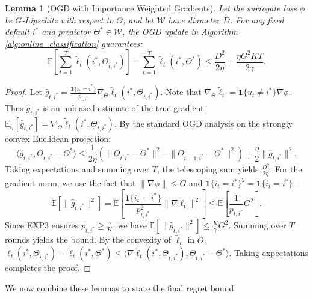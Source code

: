 \documentclass[11pt]{article}
\newtheorem{lemma}{Lemma}
\begin{document}
\begin{lemma}[OGD with Importance Weighted Gradients]
\label{lem:ogd}
Let the surrogate loss $\phi$ be $G$-Lipschitz with respect to $\Theta$, and let $\mathcal{W}$ have diameter $D$. For any fixed default $i^*$ and predictor $\Theta^* \in \mathcal{W}$, the OGD update in Algorithm \ref{alg:online_classification} guarantees:
\begin{equation}
    \mathbb{E}\left[ \sum_{t=1}^T \tilde{\ell}_t(i^*, \Theta_{t, i^*}) \right] - \sum_{t=1}^T \tilde{\ell}_t(i^*, \Theta^*) \le \frac{D^2}{2\eta} + \frac{\eta G^2 K T}{2 \gamma}.
\end{equation}
\end{lemma}
\begin{proof}
Let $\hat{g}_{t, i^*} = \frac{\mathbf{1}\{i_t = i^*\}}{p_{t, i^*}} \nabla_{\Theta} \tilde{\ell}_t(i^*, \Theta_{t, i^*})$. Note that $\nabla_{\Theta} \tilde{\ell}_t = \mathbf{1}\{u_t \neq i^*\} \nabla \phi$. Thus $\hat{g}_{t, i^*}$ is an unbiased estimate of the true gradient: $\mathbb{E}_{i_t}[\hat{g}_{t, i^*}] = \nabla_{\Theta} \tilde{\ell}_t(i^*, \Theta_{t, i^*})$.
By the standard OGD analysis on the strongly convex Euclidean projection:
$$ \langle \hat{g}_{t, i^*}, \Theta_{t, i^*} - \Theta^* \rangle \le \frac{1}{2\eta} \left( \|\Theta_{t, i^*} - \Theta^*\|^2 - \|\Theta_{t+1, i^*} - \Theta^*\|^2 \right) + \frac{\eta}{2} \|\hat{g}_{t, i^*}\|^2. $$
Taking expectations and summing over $T$, the telescoping sum yields $\frac{D^2}{2\eta}$. For the gradient norm, we use the fact that $\|\nabla \phi\| \le G$ and $\mathbf{1}\{i_t = i^*\}^2 = \mathbf{1}\{i_t = i^*\}$:
$$ \mathbb{E}[\|\hat{g}_{t, i^*}\|^2] = \mathbb{E}\left[ \frac{\mathbf{1}\{i_t = i^*\}}{p_{t, i^*}^2} \|\nabla \tilde{\ell}_t\|^2 \right] \le \mathbb{E}\left[ \frac{1}{p_{t, i^*}} G^2 \right]. $$
Since EXP3 ensures $p_{t, i^*} \ge \frac{\gamma}{K}$, we have $\mathbb{E}[\|\hat{g}_{t, i^*}\|^2] \le \frac{K}{\gamma} G^2$. Summing over $T$ rounds yields the bound.
By the convexity of $\tilde{\ell}_t$ in $\Theta$, $\tilde{\ell}_t(i^*, \Theta_{t, i^*}) - \tilde{\ell}_t(i^*, \Theta^*) \le \langle \nabla \tilde{\ell}_t(i^*, \Theta_{t, i^*}), \Theta_{t, i^*} - \Theta^* \rangle$. Taking expectations completes the proof.
\end{proof}

We now combine these lemmas to state the final regret bound.
\end{document}
